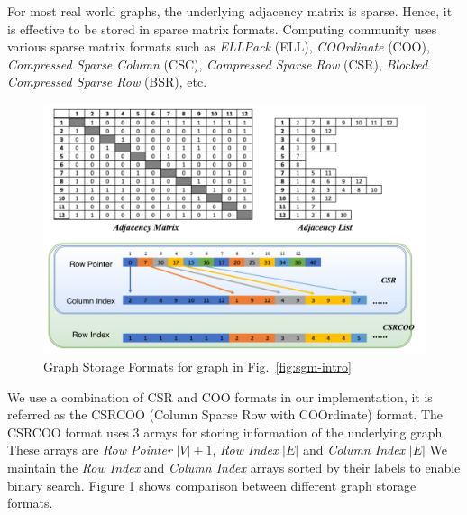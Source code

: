 For most real world graphs, the underlying adjacency matrix is sparse. Hence, it is effective to be stored in sparse matrix formats.
Computing community uses various sparse matrix formats such as \textit{ELLPack} (ELL), \textit{COOrdinate} (COO), \textit{Compressed Sparse Column} (CSC), \textit{Compressed Sparse Row} (CSR), \textit{Blocked Compressed Sparse Row} (BSR), etc.


\begin{figure}[h]
    \includegraphics[width=\textwidth]{fig/graph-storage.png}
    \caption{Graph Storage Formats for graph in Fig.\ \ref{fig:sgm-intro}}
    \label{fig:graph-storage}
\end{figure}

We use a combination of CSR and COO formats in our implementation, it is referred as the CSRCOO (Column Sparse Row with COOrdinate) format.
The CSRCOO format uses 3 arrays for storing information of the underlying graph.
These arrays are \textit{Row Pointer} $|V|+1$, \textit{Row Index} $|E|$ and \textit{Column Index} $|E|$
We maintain the \textit{Row Index} and \textit{Column Index} arrays sorted by their labels to enable binary search.
Figure \ref{fig:graph-storage} shows comparison between different graph storage formats.
